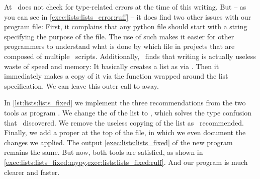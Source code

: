 At \ruff\ does not check for type-related errors at the time of this writing.
But -- as you can see in \cref{exec:lists:lists_error:ruff} -- it does find two other issues with our program file:
First, it complains that any python file should start with a string specifying the purpose of the file.
The use of such  makes it easier for other programmers to understand what is done by which file in projects that are composed of multiple \python\ scripts.%
%
%
%
Additionally, \ruff\ finds that writing  is actually useless waste of speed and memory:
It basically creates a list as  via \pythonil{[1, 2, 3]}.
Then it immediately makes a copy of it via the  function wrapped around the list specification.
We can leave this outer call to  away.

%
%
%
%
\begin{sloppypar}%
In \cref{lst:lists:lists_fixed} we implement the three recommendations from the two tools as program .
We change the  of the list to , which solves the type confusion that \mypy\ discovered.
We remove the useless copying of the list as \ruff\ recommended.
Finally, we add a proper  at the top of the file, in which we even document the changes we applied.
The output \cref{exec:lists:lists_fixed} of the new program remains the same.
But now, both tools are satisfied, as shown in \cref{exec:lists:lists_fixed:mypy,exec:lists:lists_fixed:ruff}.
And our program is much clearer and faster.%
\end{sloppypar}%
%
%
%
%
%


